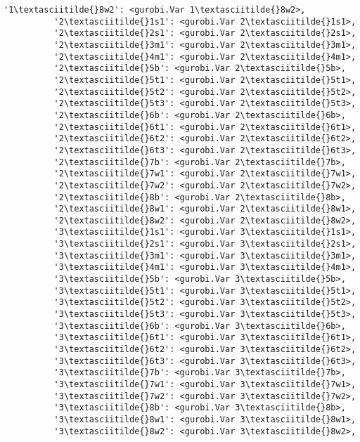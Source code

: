 \documentclass[11pt]{article}
\begin{document}
\begin{Verbatim}[commandchars=\\\{\}]
          '1\textasciitilde{}8w2': <gurobi.Var 1\textasciitilde{}8w2>,
          '2\textasciitilde{}1s1': <gurobi.Var 2\textasciitilde{}1s1>,
          '2\textasciitilde{}2s1': <gurobi.Var 2\textasciitilde{}2s1>,
          '2\textasciitilde{}3m1': <gurobi.Var 2\textasciitilde{}3m1>,
          '2\textasciitilde{}4m1': <gurobi.Var 2\textasciitilde{}4m1>,
          '2\textasciitilde{}5b': <gurobi.Var 2\textasciitilde{}5b>,
          '2\textasciitilde{}5t1': <gurobi.Var 2\textasciitilde{}5t1>,
          '2\textasciitilde{}5t2': <gurobi.Var 2\textasciitilde{}5t2>,
          '2\textasciitilde{}5t3': <gurobi.Var 2\textasciitilde{}5t3>,
          '2\textasciitilde{}6b': <gurobi.Var 2\textasciitilde{}6b>,
          '2\textasciitilde{}6t1': <gurobi.Var 2\textasciitilde{}6t1>,
          '2\textasciitilde{}6t2': <gurobi.Var 2\textasciitilde{}6t2>,
          '2\textasciitilde{}6t3': <gurobi.Var 2\textasciitilde{}6t3>,
          '2\textasciitilde{}7b': <gurobi.Var 2\textasciitilde{}7b>,
          '2\textasciitilde{}7w1': <gurobi.Var 2\textasciitilde{}7w1>,
          '2\textasciitilde{}7w2': <gurobi.Var 2\textasciitilde{}7w2>,
          '2\textasciitilde{}8b': <gurobi.Var 2\textasciitilde{}8b>,
          '2\textasciitilde{}8w1': <gurobi.Var 2\textasciitilde{}8w1>,
          '2\textasciitilde{}8w2': <gurobi.Var 2\textasciitilde{}8w2>,
          '3\textasciitilde{}1s1': <gurobi.Var 3\textasciitilde{}1s1>,
          '3\textasciitilde{}2s1': <gurobi.Var 3\textasciitilde{}2s1>,
          '3\textasciitilde{}3m1': <gurobi.Var 3\textasciitilde{}3m1>,
          '3\textasciitilde{}4m1': <gurobi.Var 3\textasciitilde{}4m1>,
          '3\textasciitilde{}5b': <gurobi.Var 3\textasciitilde{}5b>,
          '3\textasciitilde{}5t1': <gurobi.Var 3\textasciitilde{}5t1>,
          '3\textasciitilde{}5t2': <gurobi.Var 3\textasciitilde{}5t2>,
          '3\textasciitilde{}5t3': <gurobi.Var 3\textasciitilde{}5t3>,
          '3\textasciitilde{}6b': <gurobi.Var 3\textasciitilde{}6b>,
          '3\textasciitilde{}6t1': <gurobi.Var 3\textasciitilde{}6t1>,
          '3\textasciitilde{}6t2': <gurobi.Var 3\textasciitilde{}6t2>,
          '3\textasciitilde{}6t3': <gurobi.Var 3\textasciitilde{}6t3>,
          '3\textasciitilde{}7b': <gurobi.Var 3\textasciitilde{}7b>,
          '3\textasciitilde{}7w1': <gurobi.Var 3\textasciitilde{}7w1>,
          '3\textasciitilde{}7w2': <gurobi.Var 3\textasciitilde{}7w2>,
          '3\textasciitilde{}8b': <gurobi.Var 3\textasciitilde{}8b>,
          '3\textasciitilde{}8w1': <gurobi.Var 3\textasciitilde{}8w1>,
          '3\textasciitilde{}8w2': <gurobi.Var 3\textasciitilde{}8w2>,

\end{Verbatim}
\end{document}
